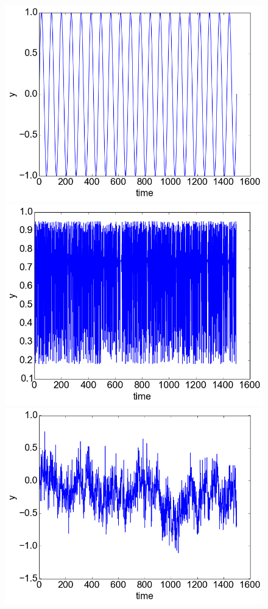 \documentclass[12pt]{article}
\begin{document}
\begin{figure}
  \centering
  \includegraphics[scale=0.4]{plot_sinusoid}
  \includegraphics[scale=0.4]{plot_logistic}
  \includegraphics[scale=0.4]{plot_fbm}

\end{figure}
\end{document}
